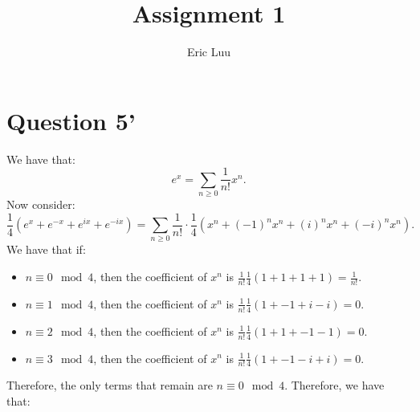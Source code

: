 \documentclass[]{article}
\title{Assignment 1}
\author{Eric Luu}
\begin{document}
\maketitle
\section{Question 5'}
We have that:
\begin{equation}
	e^x = \sum_{n \geq 0} \frac{1}{n!}x^n.
\end{equation}
Now consider:
\begin{equation}
	\frac{1}{4} \left(e^x + e^{-x} + e^{ix} + e^{-ix} \right) = \sum_{n \geq 0} \frac{1}{n!} \cdot \frac{1}{4} \left(x^n + (-1)^n x^n + (i)^n x^n + (-i)^n x^n\right).
\end{equation}
We have that if: 
\begin{itemize}
	\item $n \equiv 0 \mod 4$, then the coefficient of $x^n$ is $\frac{1}{n!}\frac{1}{4} \left(1 + 1 + 1 + 1\right) = \frac{1}{n!}$. 
	\item $n \equiv 1 \mod 4$, then the coefficient of $x^n$ is $\frac{1}{n!}\frac{1}{4} \left(1 + -1 + i -i \right) = 0$. 
	\item $n \equiv 2 \mod 4$, then the coefficient of $x^n$ is $\frac{1}{n!}\frac{1}{4} \left(1 + 1 + -1 -1 \right) = 0$. 
	\item $n \equiv 3 \mod 4$, then the coefficient of $x^n$ is $\frac{1}{n!}\frac{1}{4} \left(1 + -1 -i + i \right) = 0$. 
\end{itemize}
Therefore, the only terms that remain are $n \equiv 0 \mod 4$. Therefore, we have that:
\end{document}
